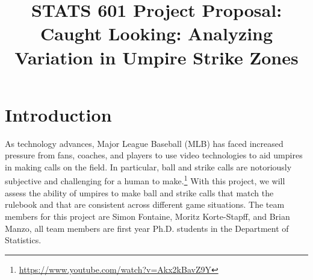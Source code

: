 \documentclass[bj, preprint]{imsart}
\begin{document}
\begin{frontmatter}

\title{{\Large STATS 601 Project Proposal:} \\ 
\bf Caught Looking: Analyzing Variation in Umpire Strike Zones}






\listoftodos
\end{frontmatter}



\section{Introduction}\label{sec:intro}
As technology advances, Major League Baseball (MLB) has faced increased pressure from fans, coaches, and players to use video technologies to aid umpires in making calls on the field.
In particular, ball and strike calls are notoriously subjective and challenging for a human to make.\footnote{\url{https://www.youtube.com/watch?v=Akx2kBavZ9Y}}
With this project, we will assess the ability of umpires to make ball and strike calls that match the rulebook and that are consistent across different game situations. 
The team members for this project are Simon Fontaine, Moritz Korte-Stapff, and Brian Manzo, all team members are first year Ph.D. students in the Department of Statistics. 
\end{document}
